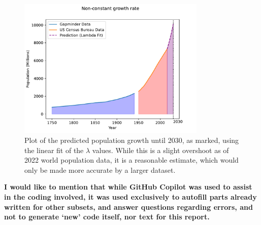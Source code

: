 \documentclass{article}
\theoremstyle{definition}
\theoremstyle{remark}
\begin{document}
\begin{figure}[H]
    \centering
    \includegraphics[width=0.8\textwidth]{non_constant_growth.pdf}
    \caption{\label{fig: Nonconstantgrowth} Plot of the predicted population growth until 2030, as marked, using the linear fit of the $\lambda$ values. While this is a slight overshoot as of 2022 world population data, it is a reasonable estimate, which would only be made more accurate by a larger dataset.}
\end{figure}

\textbf{I would like to mention that while GitHub Copilot was used to assist in the coding involved, it was used exclusively to autofill parts already written for other subsets, and answer questions regarding errors, and not to generate `new' code itself, nor text for this report.}
\end{document}
